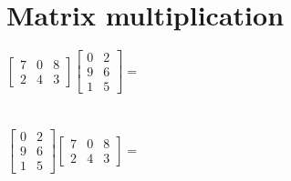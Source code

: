 \documentclass{article}
\begin{document}
\section{Matrix multiplication}
$\begin{bmatrix}
7 & 0 & 8\\
2 & 4 & 3
\end{bmatrix}
\begin{bmatrix}
0 & 2 \\
9 & 6 \\
1 & 5
\end{bmatrix} = $\\\\\\

$\begin{bmatrix}
0 & 2 \\
9 & 6 \\
1 & 5
\end{bmatrix}
\begin{bmatrix}
7 & 0 & 8\\
2 & 4 & 3
\end{bmatrix} = $\\\\\\
\end{document}
